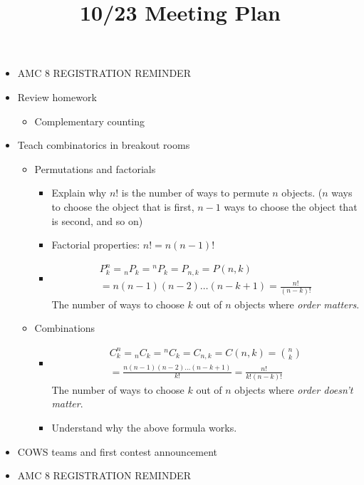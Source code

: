 \documentclass{article}
\title{10/23 Meeting Plan}
\author{}
\date{}
\begin{document}
\maketitle
\begin{itemize}
	\item AMC 8 REGISTRATION REMINDER
	\item Review homework
		\begin{itemize}
			\item Complementary counting
		\end{itemize}
	\item Teach combinatorics in breakout rooms
		\begin{itemize}
			\item Permutations and factorials
				\begin{itemize}
					\item Explain why $n!$ is the number of ways to permute $n$ 
						objects. ($n$ ways to choose the object that is first, 
						$n - 1$ ways to choose the object that is second, and so 
						on)
					\item Factorial properties: $n! = n(n - 1)!$
					\item \begin{multline*}
							P^n_k = {}_nP_k = {}^nP_k = P_{n, k} = P(n, k) \\
							= n(n - 1)(n - 2) \dots (n - k + 1) = \frac{n!}{(n - 
							k)!}
						\end{multline*}
						The number of ways to choose $k$ out of $n$ objects 
						where \emph{order matters}.
				\end{itemize}
			\item Combinations
				\begin{itemize}
					\item \begin{multline*}
							C^n_k = {}_nC_k = {}^nC_k = {}C_{n, k} = C(n, k) = 
							\binom{n}{k} \\
							= \frac{n(n - 1)(n - 2) \dots (n - k + 1)}{k!} = 
							\frac{n!}{k!(n - k)!}
						\end{multline*}
						The number of ways to choose $k$ out of $n$ objects 
						where \emph{order doesn't matter}.
					\item Understand why the above formula works.
				\end{itemize}
		\end{itemize}
		\item COWS teams and first contest announcement
		\item AMC 8 REGISTRATION REMINDER
\end{itemize}
\end{document}
